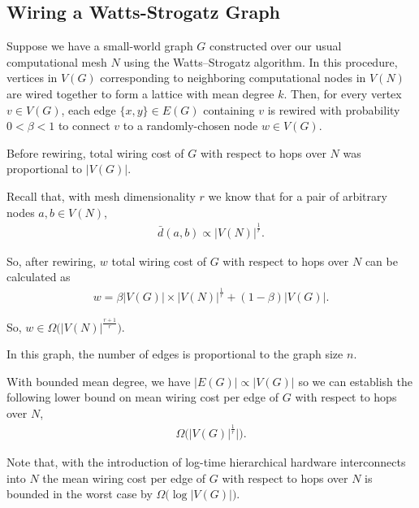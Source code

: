 \subsection{Wiring a Watts-Strogatz Graph}

Suppose we have a small-world graph $G$ constructed over our usual computational mesh $N$ using the Watts–Strogatz algorithm.
In this procedure, vertices in $V(G)$ corresponding to neighboring computational nodes in $V(N)$ are wired together to form a lattice with mean degree $k$.
Then, for every vertex $v \in V(G)$, each edge $\{x, y\} \in E(G)$ containing $v$ is rewired with probability $0 < \beta < 1$ to connect $v$ to a randomly-chosen node $w \in V(G)$.

Before rewiring, total wiring cost of $G$ with respect to hops over $N$ was proportional to $|V(G)|$.

Recall that, with mesh dimensionality $r$ we know that for a pair of arbitrary nodes $a,b \in V(N)$,
\begin{align*}
\bar{d}(a, b) \propto |V(N)|^{\frac{1}{r}}.
\end{align*}

So, after rewiring, $w$ total wiring cost of $G$ with respect to hops over $N$ can be calculated as
\begin{align*}
w = \beta |V(G)| \times |V(N)|^{\frac{1}{r}} + (1 - \beta) |V(G)|.
\end{align*}

So, $w \in \Omega \Big( |V(N)|^{\frac{r+1}{r}} \Big).$

In this graph, the number of edges is proportional to the graph size $n$.

With bounded mean degree, we have $|E(G)| \propto |V(G)|$ so we can establish the following lower bound on mean wiring cost per edge of $G$ with respect to hops over $N$,
\begin{align*}
\Omega \Big( |V(G)|^{\frac{1}{r}}| \Big).
\end{align*}

Note that, with the introduction of log-time hierarchical hardware interconnects into $N$ the mean wiring cost per edge of $G$ with respect to hops over $N$ is bounded in the worst case by $\Omega \Big( \log |V(G)| \Big)$.
